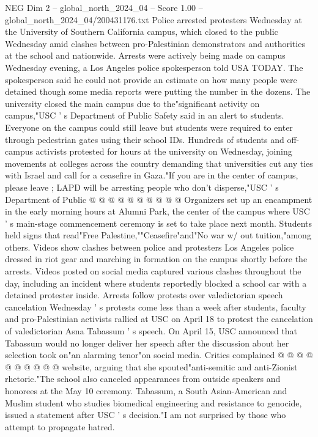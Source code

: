 \begin{textsample}{NEG Dim 2 – global\_north\_2024\_04 – Score 1.00 – global\_north\_2024\_04/200431176.txt}  \label{ex:f2_neg_279}
Police arrested protesters Wednesday at the University of Southern California campus, which closed to the public Wednesday amid clashes between pro-Palestinian demonstrators and authorities at the school and nationwide.
Arrests were actively being made on campus Wednesday evening, a Los Angeles police spokesperson told USA TODAY.
The spokesperson said he could not provide an estimate on how many people were detained though some media reports were putting the number in the dozens.
The university closed the main campus due to the"significant activity on campus,"USC ' s Department of Public Safety said in an alert to students.
Everyone on the campus could still leave but students were required to enter through pedestrian gates using their school IDs.
Hundreds of students and off-campus activists protested for hours at the university on Wednesday, joining movements at colleges across the country demanding that universities cut any ties with Israel and call for a ceasefire in Gaza."If you are in the center of campus, please leave ; LAPD will be arresting people who don't disperse,"USC ' s Department of Public @ @ @ @ @ @ @ @ @ @ Organizers set up an encampment in the early morning hours at Alumni Park, the center of the campus where USC ' s main-stage commencement ceremony is set to take place next month.
Students held signs that read"Free Palestine,""Ceasefire"and"No war w/ out tuition,"among others.
Videos show clashes between police and protesters Los Angeles police dressed in riot gear and marching in formation on the campus shortly before the arrests.
Videos posted on social media captured various clashes throughout the day, including an incident where students reportedly blocked a school car with a detained protester inside.
Arrests follow protests over valedictorian speech cancelation Wednesday ' s protests come less than a week after students, faculty and pro-Palestinian activists rallied at USC on April 18 to protest the cancelation of valedictorian Asna Tabassum ' s speech.
On April 15, USC announced that Tabassum would no longer deliver her speech after the discussion about her selection took on"an alarming tenor"on social media.
Critics complained @ @ @ @ @ @ @ @ @ @ website, arguing that she spouted"anti-semitic and anti-Zionist rhetoric."The school also canceled appearances from outside speakers and honorees at the May 10 ceremony.
Tabassum, a South Asian-American and Muslim student who studies biomedical engineering and resistance to genocide, issued a statement after USC ' s decision."I am not surprised by those who attempt to propagate hatred.

\end{textsample}
